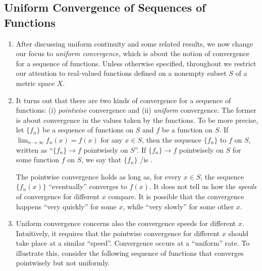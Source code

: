 \subsection{Uniform Convergence of Sequences of Functions}
\label{subsect:unif-conv-seq-fun}
\begin{enumerate}
\item After discussing uniform continuity and some related results, we now
change our focus to \emph{uniform convergence}, which is about the notion of
convergence for a sequence of functions. Unless otherwise specified, throughout
we restrict our attention to real-valued functions defined on a nonempty subset
\(S\) of a metric space \(X\).

\item It turns out that there are two kinds of convergence for a sequence of
functions: (i) \emph{pointwise} convergence and (ii) \emph{uniform} convergence.
The former is about convergence in the values taken by the functions. To be
more precise, let \(\{f_n\}\) be a sequence of functions on \(S\) and \(f\) be
a function on \(S\). If \(\lim_{n\to \infty}f_n(x)=f(x)\) for any \(x\in S\),
then the sequence \(\{f_n\}\)  to \(f\) on \(S\),
written as ``\(\{f_n\}\to f\) pointwisely on \(S\)''. If \(\{f_n\}\to f\) pointwisely on
\(S\) for some function \(f\) on \(S\), we say that \(\{f_n\}\) /is .


The pointwise convergence holds as long as, for every \(x\in S\), the sequence
\(\{f_n(x)\}\) ``eventually'' converges to \(f(x)\). It does not tell us how
the \emph{speeds} of convergence for different \(x\) compare. It is possible
that the convergence happens ``very quickly'' for some \(x\), while ``very
slowly'' for some other \(x\).

\item Uniform convergence concerns also the convergence speeds for different
\(x\). Intuitively, it requires that the pointwise convergence for different
\(x\) should take place at a similar ``speed''. Convergence occurs at a
``uniform'' rate. To illustrate this, consider the following sequence of
functions that converges pointwisely but not uniformly.


\end{enumerate}
